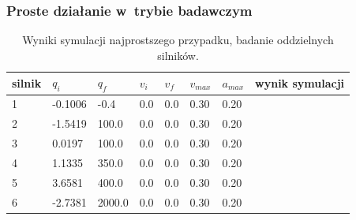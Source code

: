 \documentclass[a4paper, 12pt]{article}
\begin{document}
	\subsubsection{Proste działanie w~trybie badawczym}	
	\begin{table}[H]
	\centering
	\begin{tabular}{|m{2.5em}|m{4em}|m{4em}|m{4em}|m{4em}|m{4em}|m{4em}|m{5em}|}
	\hline
	silnik&$ q_i $ & $ q_f $ & $ v_i $ & $ v_f $ & $ v_{max} $ & $ a_{max} $&wynik symulacji\\
	\hline
	\hline
	\hspace{1em}1& -0.1006 & -0.4 & 0.0 & 0.0 & 0.30 & 0.20&\hspace{2em}\checkmark\\ %
	\hline
	\hspace{1em}2& -1.5419 & 100.0 & 0.0 & 0.0 & 0.30 & 0.20&\hspace{2em}\checkmark\\  %
	\hline
	\hspace{1em}3& 0.0197 & 100.0 & 0.0 & 0.0 & 0.30 & 0.20&\hspace{2em}\checkmark\\ %
	\hline
	\hspace{1em}4& 1.1335 & 350.0 & 0.0 & 0.0 & 0.30 & 0.20&\hspace{2em}\checkmark\\  %
	\hline
	\hspace{1em}5& 3.6581 & 400.0 & 0.0 & 0.0 & 0.30 & 0.20&\hspace{2em}\checkmark\\  %
	\hline
	\hspace{1em}6& -2.7381 & 2000.0 & 0.0 & 0.0 & 0.30 & 0.20&\hspace{2em}\checkmark\\  %
	\hline
	\end{tabular}
	\caption{Wyniki symulacji najprostszego przypadku, badanie oddzielnych silników.}
	\label{tab:simpJPV}
	\end{table}
	
\end{document}
